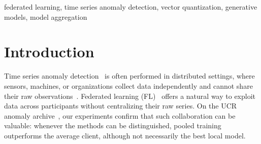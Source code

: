 \documentclass[conference]{IEEEtran}
\begin{document}
\maketitle

\begin{abstract}
Time series anomaly detection is often carried out by parties that cannot pool their raw data,
which makes federated training attractive. We ask what should be shared when the detector is a
two-stage generative model: TimeVQVAE-AD first learns a discrete tokenizer of the signal, and then
a prior over the resulting tokens. We find that the two stages cannot be federated independently.
Sharing the prior helps only once the clients' tokenizers have been aligned by averaging their
encoders, and the identical change brings nothing when they have not been, because the prior is
indexed by token identity and unaligned clients use those identities differently. We evaluate this
on the UCR anomaly archive, with every series split across five clients, on ten series used for
development and on fifty further series drawn at random in advance. The federated model improves
over local training in the ranking of anomalous timesteps, and on the archive's own localization
metric it matches pooled training on most series -- a metric on which pooled training, which sees
all the data, does not separate from local training either. We also describe a case in which averaging spreads
one client's false alarm to every client, and show that combining the local models' scores instead
of their weights avoids it.
\end{abstract}

\begin{IEEEkeywords}
federated learning, time series anomaly detection, vector quantization, generative models,
model aggregation
\end{IEEEkeywords}

\section{Introduction}

Time series anomaly detection~\cite{blazquezgarcia2022review,schmidl2022anomaly} is often
performed in distributed settings, where sensors, machines, or organizations collect data
independently and cannot share their raw observations~\cite{zhu2022fedexdnn,xu2024pefad}.
Federated learning (FL)~\cite{mcmahan2017federated} offers a natural way to exploit data
across participants without centralizing their raw series. On the UCR anomaly
archive~\cite{wu2023ucr}, our experiments confirm that such collaboration can be valuable:
whenever the methods can be distinguished, pooled training outperforms the average client,
although not necessarily the best local model.
\end{document}
